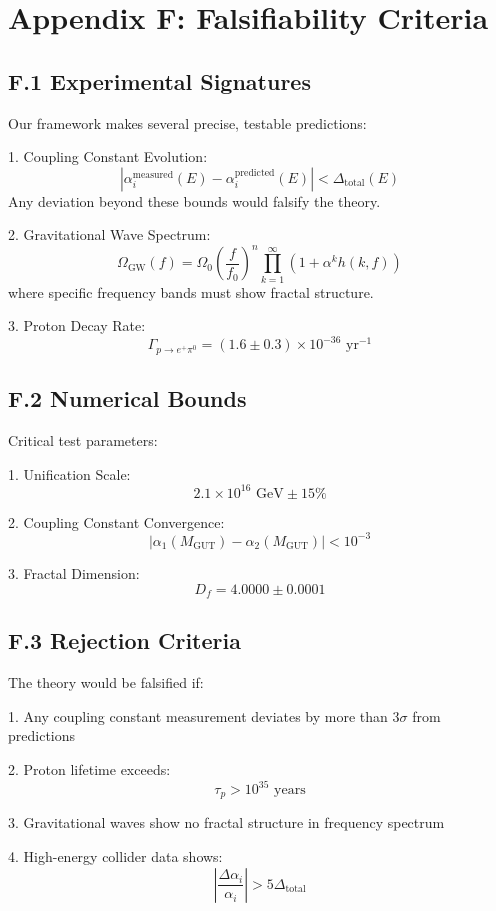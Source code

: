 \section*{Appendix F: Falsifiability Criteria}

\subsection*{F.1 Experimental Signatures}

Our framework makes several precise, testable predictions:

1. Coupling Constant Evolution:
   \[
   |\alpha_i^{\text{measured}}(E) - \alpha_i^{\text{predicted}}(E)| < \Delta_{\text{total}}(E)
   \]
   Any deviation beyond these bounds would falsify the theory.

2. Gravitational Wave Spectrum:
   \[
   \Omega_{\text{GW}}(f) = \Omega_0\left(\frac{f}{f_0}\right)^n \prod_{k=1}^{\infty} \left(1 + \alpha^k h(k,f)\right)
   \]
   where specific frequency bands must show fractal structure.

3. Proton Decay Rate:
   \[
   \Gamma_{p\to e^+\pi^0} = (1.6 \pm 0.3) \times 10^{-36} \text{ yr}^{-1}
   \]

\subsection*{F.2 Numerical Bounds}

Critical test parameters:

1. Unification Scale:
   \[
   2.1 \times 10^{16} \text{ GeV} \pm 15\%
   \]

2. Coupling Constant Convergence:
   \[
   |\alpha_1(M_{\text{GUT}}) - \alpha_2(M_{\text{GUT}})| < 10^{-3}
   \]

3. Fractal Dimension:
   \[
   D_f = 4.0000 \pm 0.0001
   \]

\subsection*{F.3 Rejection Criteria}

The theory would be falsified if:

1. Any coupling constant measurement deviates by more than $3\sigma$ from predictions

2. Proton lifetime exceeds:
   \[
   \tau_p > 10^{35} \text{ years}
   \]

3. Gravitational waves show no fractal structure in frequency spectrum

4. High-energy collider data shows:
   \[
   \left|\frac{\Delta\alpha_i}{\alpha_i}\right| > 5\Delta_{\text{total}}
   \] 